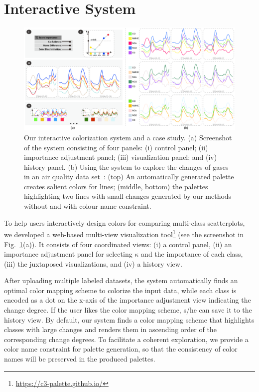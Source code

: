 \section{Interactive System}


\begin{figure}[ht]
\centering
\includegraphics[width=1.0\columnwidth]{figures/interface.pdf}
\caption{Our interactive colorization system and a case study. (a) Screenshot of the system consisting of four panels: (i) control panel; (ii) importance adjustment panel; (iii) visualization panel; and (iv) history panel. (b) Using the system to explore the changes of gases in an air quality data set~\cite{DEVITO2008750}: (top) An automatically generated palette creates salient colors for lines; (middle, bottom) the palettes highlighting two lines with small changes generated by our methods without and with colour name constraint.}
\vspace*{-3mm}
\label{fig:ui-case}
\end{figure}

\label{sec:interaction}
To help users interactively design colors for comparing multi-class scatterplots, we developed a web-based multi-view visualization tool\footnote{\small \url{https://c3-palette.github.io/}}
(see the screenshot in Fig.~\ref{fig:ui-case}(a)).
It consists of four coordinated views: (i) a control panel, (ii) an importance adjustment panel for selecting $\kappa$ and  the importance of each class, (iii) the juxtaposed visualizations, and (iv) a history view.

After uploading multiple labeled datasets, the system automatically finds an optimal color mapping scheme to colorize the input data, while each class is encoded as a dot on the x-axis of the importance adjustment view indicating the change degree. If the user likes the color mapping scheme, s/he can save it to the history view. By default, our system finds a color mapping scheme that highlights classes with large changes and renders them in ascending order of the corresponding change degrees.
To facilitate a coherent exploration, we provide a color name constraint for palette generation, so that the consistency of color names will be preserved in the produced palettes.









